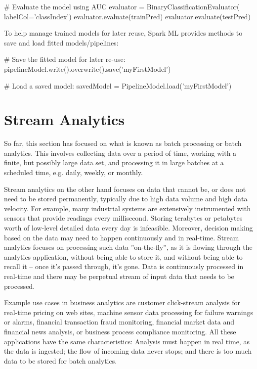 \begin{pythoncode}
# Evaluate the model using AUC
evaluator = BinaryClassificationEvaluator(
    labelCol='classIndex')
evaluator.evaluate(trainPred)
evaluator.evaluate(testPred)
\end{pythoncode}

To help manage trained models for later reuse, Spark ML provides methods to save and load fitted models/pipelines:

\begin{pythoncode}
# Save the fitted model for later re-use:
pipelineModel.write().overwrite().save('myFirstModel')

# Load a saved model:
savedModel = PipelineModel.load('myFirstModel')
\end{pythoncode}


\section{Stream Analytics}

So far, this section has focused on what is known as batch processing or batch analytics. This involves collecting data over a period of time, working with a finite, but possibly large data set, and processing it in large batches at a scheduled time, e.g. daily, weekly, or monthly.

Stream analytics on the other hand focuses on data that cannot be, or does not need to be stored permanently, typically due to high data volume and high data velocity. For example, many industrial systems are extensively instrumented with sensors that provide readings every millisecond. Storing terabytes or petabytes worth of low-level detailed data every day is infeasible. Moreover, decision making based on the data may need to happen continuously and in real-time. Stream analytics focuses on processing such data ''on-the-fly'', as it is flowing through the analytics application, without being able to store it, and without being able to recall it -- once it's passed through, it's gone. Data is continuously processed in real-time and there may be perpetual stream of input data that needs to be processed. 

Example use cases in business analytics are customer click-stream analysis for real-time pricing on web sites, machine sensor data processing for failure warnings or alarms, financial transaction fraud monitoring, financial market data and financial news analysis, or business process compliance monitoring. All these applications have the same characteristics: Analysis must happen in real time, as the data is ingested; the flow of incoming data never stops; and there is too much data to be stored for batch analytics.

